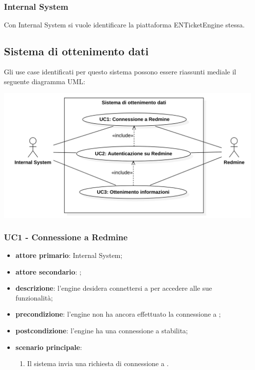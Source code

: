 \subsubsection{Internal System}
Con Internal System si vuole identificare la piattaforma ENTicketEngine stessa.


\subsection{Sistema di ottenimento dati}
Gli use case identificati per questo sistema possono essere riassunti mediale il seguente diagramma UML:
\begin{center}
	\includegraphics[keepaspectratio = true, width=15cm]{immagini/uc/1.png}
\end{center}
\subsubsection{UC1 - Connessione a Redmine}
\begin{itemize}
	\item \textbf{attore primario}: Internal System;
	\item \textbf{attore secondario}: ;
	\item \textbf{descrizione}: l'engine desidera connettersi a  per accedere alle sue funzionalità;
	\item \textbf{precondizione}: l'engine non ha ancora effettuato la connessione a ;
	\item \textbf{postcondizione}: l'engine ha una connessione a  stabilita;
	\item \textbf{scenario principale}: 
	\begin{enumerate}
		\item Il sistema invia una richiesta di connessione a .
	\end{enumerate}
\end{itemize}

